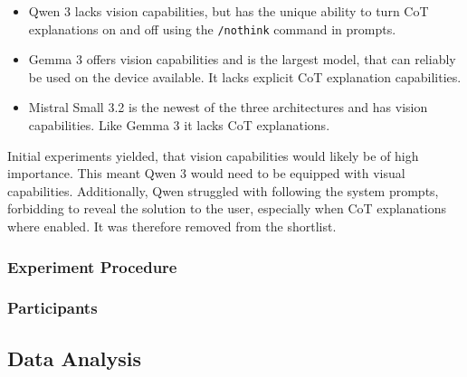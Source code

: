 \begin{itemize}
    \item Qwen 3 \parencite{Yang2025} lacks vision capabilities, but has the unique ability to turn \ac{CoT} explanations on and off using the \texttt{/nothink} command in prompts.

    \item Gemma 3 \parencite{GemmaTeam2025} offers vision capabilities and is the largest model, that can reliably be used on the device available. It lacks explicit \ac{CoT} explanation capabilities.

    \item Mistral Small 3.2 \parencite{Mistral2025} is the newest of the three architectures and has vision capabilities. Like Gemma 3 it lacks \ac{CoT} explanations.
\end{itemize}

Initial experiments yielded, that vision capabilities would likely be of high importance. This meant Qwen 3 would need to be equipped with visual capabilities. Additionally, Qwen struggled with following the system prompts, forbidding to reveal the solution to the user, especially when \ac{CoT} explanations where enabled. It was therefore removed from the shortlist.

\subsubsection{Experiment Procedure} \label{sssec:experiment_procedure}


\subsubsection{Participants} \label{sssec:participants}


\subsection{Data Analysis} \label{ssec:data_analysis}
